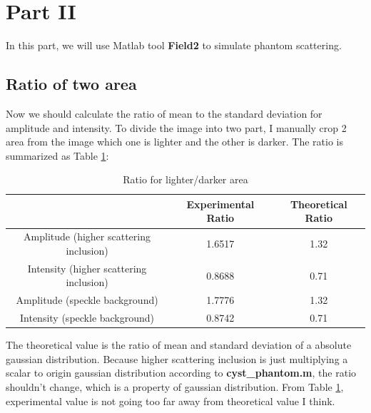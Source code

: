 \documentclass{article}
\begin{document}
\section{Part \RN{2}}
In this part, we will use Matlab tool \textbf{Field2} to simulate phantom scattering.

\subsection{Ratio of two area}
Now we should calculate the ratio of mean to the standard deviation for amplitude and intensity. To divide the image into
two part, I manually crop 2 area from the image which one is lighter and the other is darker. The ratio is summarized as Table \ref{tab:ratio}:

\begin{table}[H]
  \centering
    \begin{tabular}{|c|c|c|}
    \hline
          & Experimental Ratio & Theoretical Ratio \bigstrut\\
    \hline
    Amplitude (higher scattering inclusion) &   1.6517    &  1.32  \bigstrut\\
    \hline
    Intensity (higher scattering inclusion) &   0.8688    &  0.71 \bigstrut\\
    \hline
    Amplitude (speckle background) &   1.7776    &   1.32 \bigstrut\\
    \hline
    Intensity (speckle background) &   0.8742    &  0.71 \bigstrut\\
    \hline
    \end{tabular}%
  \caption{Ratio for lighter/darker area}
  \label{tab:ratio}%
\end{table}%
The theoretical value is the ratio of mean and standard deviation of a absolute gaussian distribution. Because higher scattering inclusion
is just multiplying a scalar to origin gaussian distribution according to \textbf{cyst\_phantom.m}, 
the ratio shouldn't change, which is a property of gaussian distribution.
From Table \ref{tab:ratio}, experimental value is not going too far away from theoretical value I think.
\end{document}
